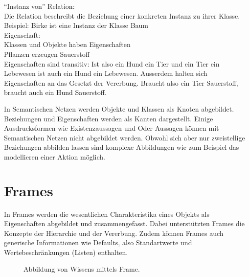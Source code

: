 "`Instanz von"' Relation:\\
\noindent\hspace*{15mm} Die Relation beschreibt die Beziehung einer konkreten Instanz zu ihrer Klasse.\\
\noindent\hspace*{15mm} Beispiel: Birke ist eine Instanz der Klasse Baum\\

Eigenschaft:\\
\noindent\hspace*{15mm} Klassen und Objekte haben Eigenschaften\\
\noindent\hspace*{15mm} Pflanzen erzeugen Sauerstoff\\


Eigenschaften sind transitiv: Ist also ein Hund ein Tier und ein Tier ein Lebewesen ist auch ein Hund ein Lebewesen. Ausserdem halten sich Eigenschaften an das Gesetzt der Vererbung. Braucht also ein Tier Sauerstoff, braucht auch ein Hund Sauerstoff.

In Semantischen Netzen werden Objekte und Klassen als Knoten abgebildet. Beziehungen und Eigenschaften werden als Kanten dargestellt.
Einige Ausdrucksformen wie Existenzaussagen und Oder Aussagen können mit Semantischen Netzen nicht abgebildet werden. Obwohl sich aber nur zweistellige Beziehungen abbilden lassen sind komplexe Abbildungen wie zum Beispiel das modellieren einer Aktion möglich.

\section{Frames}
\label{sec:wissensrepFormen_frames}

In Frames werden die wesentlichen Charakteristika eines Objekts als Eigenschaften abgebildet und zusammengefasst. Dabei unterstützten Frames die Konzepte der Hierarchie und der Vererbung. Zudem können Frames auch generische Informationen wie Defaults, also Standartwerte und Wertebeschränkungen (Listen) enthalten.

\begin{figure}[htbp]
\centering {}
\caption{Abbildung von Wissens mittels Frame.\label{fig:frames}\protect\footnotemark}
\end{figure}

